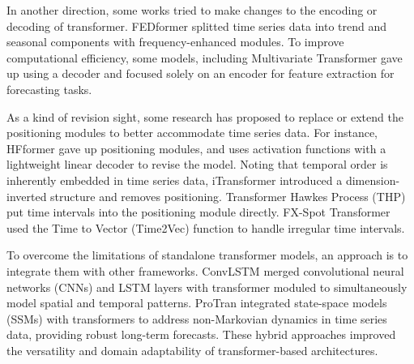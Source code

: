 \documentclass[preprint,12pt]{elsarticle}
\begin{document}
In another direction, some works tried to make changes to the encoding or decoding of transformer. FEDformer \citep{zhou2022fedformer} splitted time series data into trend and seasonal components with frequency-enhanced modules. To improve computational efficiency, some models, including Multivariate Transformer \citep{zerveas2021transformer} gave up using a decoder and focused solely on an encoder for feature extraction for forecasting tasks. 

As a kind of revision sight, some research has proposed to replace or extend the positioning modules to better accommodate time series data. For instance, HFformer \citep{barez2023exploring} gave up positioning modules, and uses activation functions with a lightweight linear decoder to revise the model. Noting that temporal order is inherently embedded in time series data, iTransformer \citep{liu2024itransformer} introduced a dimension-inverted structure and removes positioning. Transformer Hawkes Process (THP) \citep{zuo2020transformer} put time intervals into the positioning module directly. FX-Spot Transformer \citep{fischer2024fx} used the Time to Vector (Time2Vec) function to handle irregular time intervals.

To overcome the limitations of standalone transformer models, an approach is to integrate them with other frameworks. ConvLSTM \citep{kim2024physics} merged convolutional neural networks (CNNs) and LSTM layers with transformer moduled to simultaneously model spatial and temporal patterns. ProTran \citep{tang2021probabilistic} integrated state-space models (SSMs) with transformers to address non-Markovian dynamics in time series data, providing robust long-term forecasts. These hybrid approaches improved the versatility and domain adaptability of transformer-based architectures.
\end{document}
